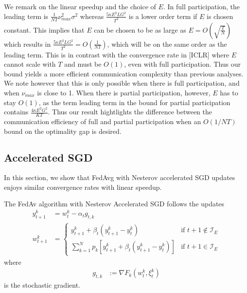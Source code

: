 \begin{remark}
	We remark on the linear speedup and the choice of $E$. In full participation,
	the leading term is $\frac{1}{NT}\nu_{max}^{2}\sigma^{2}$ whereas
	$\frac{5\kappa E^{2}LG^{2}}{T^{2}}$ is a lower order term if $E$
	is chosen constant. This implies that $E$ can be chosen to be as
	large as $E=O(\sqrt{\frac{T}{N}})$ which results in $\frac{5\kappa E^{2}LG^{2}}{T^{2}}=O(\frac{1}{NT})$,
	which will be on the same order as the leading term. This is in contrast
	with the convergence rate in {[}ICLR{]} where $E$ cannot scale with
	$T$ and must be $O(1)$, even with full participation. Thus our bound
	yields a more efficient communication complexity than previous analyses.
	We note however that this is only possible when there is full participation,
	and when $\nu_{max}$ is close to 1. When there is partial participation,
	however, $E$ has to stay $O(1)$, as the term leading term in the
	bound for partial participation contains $\frac{4\kappa E^{2}G^{2}}{KT}$.
	Thus our result hightlights the difference between the communication
	efficiency of full and partial participation when an $O(1/NT)$ bound
	on the optimality gap is desired. 
	
	\textbf{}%
	\begin{comment}
	This implies that $E$ canot be chosen $O(T^{\beta})$ for any $\beta>0$
	without degrading the performance. This should be checked in experiments,
	whether with partial participation if the communication round is set
	to scale with $T$, the convergence deteriorates. This is in constrast
	with the full participation case, where $E=O(\sqrt{\frac{T}{N}})$
	is allowed. \textbf{If we can confirm that full participation allows
	linear speedup with $\nu=N\cdot\max_{k}p_{k}\approx1$ and $E=O(\sqrt{\frac{T}{N}})$,
	whereas partial participation only allows $E=O(1)$, then this would
	an interesting phenomenon that is not reported by previous studies!}
	\end{comment}
\end{remark}

\subsection{Accelerated SGD}
In this section, we show that FedAvg with Nesterov accelerated SGD updates enjoys similar convergence rates with linear speedup. 

The FedAv algorithm with Nesterov Accelerated
SGD follows the updates
\begin{align*}
y_{t+1}^{k} & =w_{t}^{k}-\alpha_{t}g_{t,k}\\
w_{t+1}^{k} & =\begin{cases}
y_{t+1}^{k}+\beta_{t}(y_{t+1}^{k}-y_{t}^{k}) & \text{if }t+1\notin\mathcal{I}_{E}\\
\sum_{k=1}^{N}p_{k}\left[y_{t+1}^{k}+\beta_{t}(y_{t+1}^{k}-y_{t}^{k})\right] & \text{if }t+1\in\mathcal{I}_{E}
\end{cases}
\end{align*}
where 
\begin{align*}
g_{t,k} & :=\nabla F_{k}(w_{t}^{k},\xi_{t}^{k})
\end{align*}
is the stochastic gradient.


